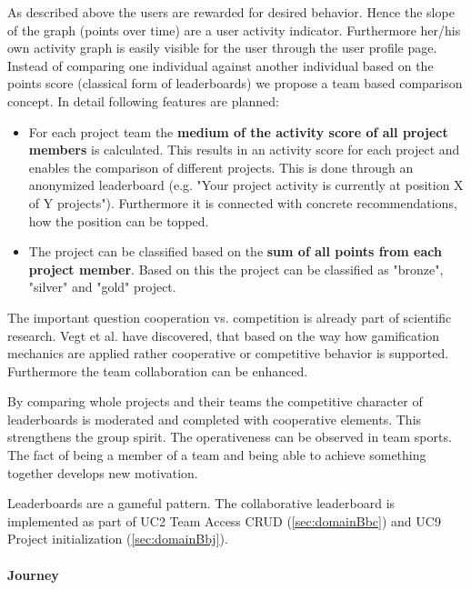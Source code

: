 As described above the users are rewarded for desired behavior. Hence the slope of the graph (points over time) are a user activity indicator. Furthermore her/his own activity graph is easily visible for the user through the user profile page.
Instead of comparing one individual against another individual based on the points score (classical form of leaderboards) we propose a team based comparison concept. 
In detail following features are planned:
\begin{itemize}
	\item For each project team the \textbf{medium of the activity score of all project members} is calculated. This results in an activity score for each project and enables the comparison of different projects. This is done through an anonymized leaderboard (e.g. "Your project activity is currently at position X of Y projects"). Furthermore it is connected with concrete recommendations, how the position can be topped.
	\item The project can be classified based on the \textbf{sum of all points from each project member}. Based on this the project can be classified as "bronze", "silver" and "gold" project.
\end{itemize}

The important question cooperation vs. competition is already part of scientific research. Vegt et al. \cite{vegtDesigningGamificationGuide2015} have discovered, that based on the way how gamification mechanics are applied rather cooperative or competitive behavior is supported. Furthermore the team collaboration can be enhanced.

By comparing whole projects and their teams the competitive character of leaderboards is moderated and completed with cooperative elements. This strengthens the group spirit. The operativeness can be observed in team sports. The fact of being a member of a team and being able to achieve something together develops new motivation.

Leaderboards are a gameful pattern. 
The collaborative leaderboard is implemented as part of \ac{UC}2 Team Access CRUD (\ref{sec:domainBbc}) and \ac{UC}9 Project initialization (\ref{sec:domainBbj}).

\paragraph*{Journey}

